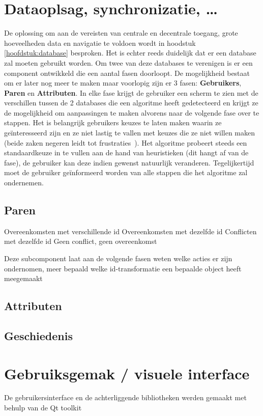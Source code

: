 \section{Dataoplsag, synchronizatie, \ldots}
De oplossing om aan de vereisten van centrale en decentrale toegang, grote hoeveelheden data en navigatie te voldoen wordt in hoodstuk \ref{hoofdstuk:database} besproken. Het is echter reeds duidelijk dat er een database zal moeten gebruikt worden. Om twee van deze databases te verenigen is er een component ontwikkeld die een aantal fasen doorloopt. De mogelijkheid bestaat om er later nog meer te maken maar voorlopig zijn er 3 fasen: \textbf{Gebruikers}, \textbf{Paren} en \textbf{Attributen}. In elke fase krijgt de gebruiker een scherm te zien met de verschillen tussen de 2 databases die een algoritme heeft gedetecteerd en krijgt ze de mogelijkheid om aanpassingen te maken alvorens naar de volgende fase over te stappen. Het is belangrijk gebruikers keuzes te laten maken waarin ze ge\"interesseerd zijn en ze niet lastig te vallen met keuzes die ze niet willen maken (beide zaken negeren leidt tot frustraties~\cite{Joel2001}). Het algoritme probeert steeds een standaardkeuze in te vullen aan de hand van heuristieken (dit hangt af van de fase), de gebruiker kan deze indien gewenst natuurlijk veranderen. Tegelijkertijd moet de gebruiker ge\"informeerd worden van alle stappen die het algoritme zal ondernemen. 

\subsection{Paren}

Overeenkomsten met verschillende id
Overeenkomsten met dezelfde id
Conflicten met dezelfde id
Geen conflict, geen overeenkomst

Deze subcomponent laat aan de volgende fasen weten welke acties er zijn ondernomen, meer bepaald welke id-transformatie een bepaalde object heeft meegemaakt

\subsection{Attributen}
\subsection{Geschiedenis}

\section{Gebruiksgemak / visuele interface}
De gebruikersinterface en de achterliggende bibliotheken werden gemaakt met behulp van de Qt toolkit~\cite{qtdoc}


